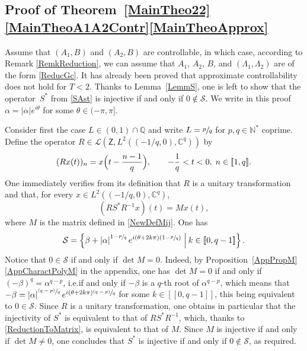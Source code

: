 \documentclass[10pt]{amsart}
\newcommand{\psfrac}[2]{\sfrac{(#1)}{#2}}
\newcommand{\llbracket}{[\![}
\newcommand{\rrbracket}{]\!]}
\theoremstyle{plain}
\theoremstyle{definition}
\newcommand{\midsuchthat}{\;\middle|\:}
\newcommand{\abs}[1]{\left\lvert #1\right \rvert}
\providecommand{\ie}{i.e.}\providecommand{\etc}{etc.}\providecommand{\resp}{resp.}\providecommand{\cf}{cf.}
\begin{document}
\subsection{Proof of Theorem~\ref{MainTheo22}\eqref{MainTheoA1A2Contr}\eqref{MainTheoApprox}}

Assume that $(A_1, B)$ and $(A_2, B)$ are controllable, in which case, according to Remark \ref{RemkReduction}, we can assume that $A_1$, $A_2$, $B$, and $(\Lambda_1, \Lambda_2)$ are of the form \eqref{ReducGc}. It has already been proved that approximate controllability does not hold for $T < 2$. Thanks to Lemma~\ref{LemmS}, one is left to show that the operator~$S^\ast$ from \eqref{SAst} is injective if and only if $0 \notin \mathcal S$. We write in this proof $\alpha = \abs{\alpha} e^{i\theta}$ for some $\theta \in (-\pi, \pi]$.

Consider first the case $L \in (0, 1) \cap \mathbb Q$ and write $L = \sfrac{p}{q}$ for $p, q \in \mathbb N^\ast$ coprime. Define the operator $R \in \mathcal L\left(\mathsf Z, L^2\left(\left(-{1}/{q}, 0\right), \mathbb C^q\right)\right)$ by
\[
(R x(t))_n = x\Bigl(t - \frac{n-1}{q}\Bigr), \qquad -\frac{1}{q} < t < 0, \; n \in \llbracket 1, q\rrbracket.
\]
One immediately verifies from its definition that $R$ is a unitary transformation and that, for every $x \in L^2\left(\left(-{1}/{q}, 0\right), \mathbb C^q\right)$,
\begin{equation}
\label{ReductionToMatrix}
(R S^\ast R^{-1} x)(t) = M x(t),
\end{equation}
where $M$ is the matrix defined in \eqref{NewDefMij}. One has
\begin{equation}
\label{CRational}
\mathcal S = \left\{\beta + \abs{\alpha}^{1 - \sfrac{p}{q}} e^{i (\theta + 2 k \pi)\left(1 - \sfrac{p}{q}\right)} \midsuchthat k \in \llbracket 0, q - 1\rrbracket\right\}.
\end{equation}
Notice that $0 \in \mathcal S$ if and only if $\det M = 0$. Indeed, by Proposition~\ref{AppPropM}\eqref{AppCharactPolyM} in the appendix, one has $\det M = 0$ if and only if $(-\beta)^q = \alpha^{q - p}$, \ie if and only if $-\beta$ is a $q$-th root of $\alpha^{q - p}$, which means that $-\beta = \abs{\alpha}^{\psfrac{q - p}{q}} e^{i(\theta + 2 k \pi)\psfrac{q - p}{q}}$ for some $k \in \llbracket 0, q-1\rrbracket$, this being equivalent to $0 \in \mathcal S$. Since $R$ is a unitary transformation, one obtains in particular that the injectivity of $S^\ast$ is equivalent to that of $R S^\ast R^{-1}$, which, thanks to \eqref{ReductionToMatrix}, is equivalent to that of $M$. Since $M$ is injective if and only if $\det M \neq 0$, one concludes that $S^\ast$ is injective if and only if $0 \notin \mathcal S$, as required.
\end{document}
